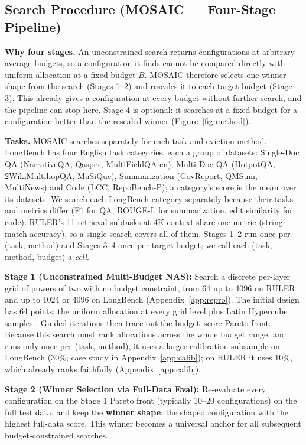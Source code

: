 \documentclass[11pt]{article}
\begin{document}
\subsection{Search Procedure (MOSAIC — Four-Stage Pipeline)}

\textbf{Why four stages.} An unconstrained search returns configurations at arbitrary average budgets, so a configuration it finds cannot be compared directly with uniform allocation at a fixed budget $B$. MOSAIC therefore selects one winner shape from the search (Stages 1--2) and rescales it to each target budget (Stage 3). This already gives a configuration at every budget without further search, and the pipeline can stop here. Stage 4 is optional: it searches at a fixed budget for a configuration better than the rescaled winner (Figure~\ref{fig:method}).

\textbf{Tasks.}\label{sec:method-tasks} MOSAIC searches separately for each task and eviction method. LongBench has four English task categories, each a group of datasets: Single-Doc QA (NarrativeQA, Qasper, MultiFieldQA-en), Multi-Doc QA (HotpotQA, 2WikiMultihopQA, MuSiQue), Summarization (GovReport, QMSum, MultiNews) and Code (LCC, RepoBench-P); a category's score is the mean over its datasets. We search each LongBench category separately because their tasks and metrics differ (F1 for QA, ROUGE-L for summarization, edit similarity for code). RULER's 11 retrieval subtasks at 4K context share one metric (string-match accuracy), so a single search covers all of them. Stages 1--2 run once per (task, method) and Stages 3--4 once per target budget; we call each (task, method, budget) a \emph{cell}.

\textbf{Stage 1 (Unconstrained Multi-Budget NAS):} Search a discrete per-layer grid of powers of two with no budget constraint, from 64 up to 4096 on RULER and up to 1024 or 4096 on LongBench (Appendix~\ref{app:repro}). The initial design has 64 points: the uniform allocation at every grid level plus Latin Hypercube samples \citep{mckay1979comparison}. Guided iterations then trace out the budget--score Pareto front. Because this search must rank allocations across the whole budget range, and runs only once per (task, method), it uses a larger calibration subsample on LongBench (30\%; case study in Appendix~\ref{app:calib}); on RULER it uses 10\%, which already ranks faithfully (Appendix~\ref{app:calib}).

\textbf{Stage 2 (Winner Selection via Full-Data Eval):} Re-evaluate every configuration on the Stage 1 Pareto front (typically 10--20 configurations) on the full test data, and keep the \textbf{winner shape}: the shaped configuration with the highest full-data score. This winner becomes a universal anchor for all subsequent budget-constrained searches.
\end{document}
